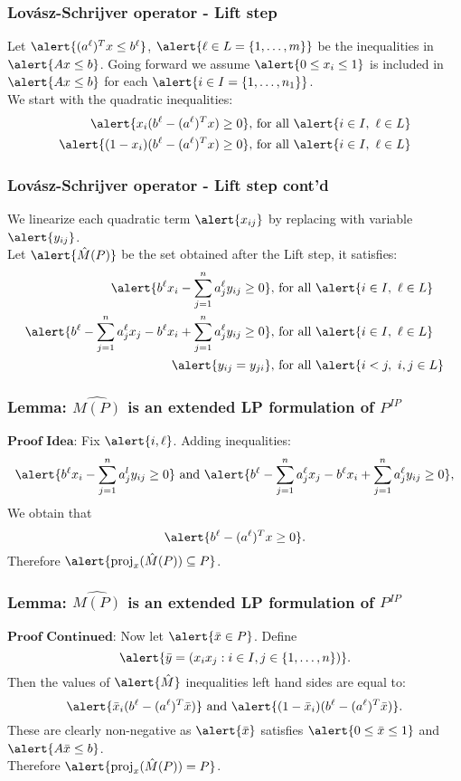 \documentclass{beamer}
\DeclareMathOperator{\proj}{proj}
\begin{document}
\begin{frame}
\frametitle{Lov\'asz-Schrijver operator - Lift step}
Let $\alert{(a^\ell)^Tx \leq b^\ell}$, $\alert{\ell \in L = \{1, \dots, m\}}$ be the inequalities in $\alert{Ax \leq b}$. Going forward we assume $\alert{0 \leq x_i \leq 1}$ is included in $\alert{Ax \leq b}$ for each $\alert{i \in I = \{1,\dots,n_1\}}$.
\\ We start with the quadratic inequalities:
\begin{align*}
\alert{x_i(b^\ell - (a^\ell)^Tx) \geq 0}, &\text{ for all } \alert{i\in I,\ \ell \in L} \\
\alert{(1-x_i)(b^\ell - (a^\ell)^Tx) \geq 0}, &\text{ for all }\alert{ i\in I,\ \ell \in L} \\
\end{align*}
\end{frame}
\begin{frame}
\frametitle{Lov\'asz-Schrijver operator - Lift step cont'd}
We linearize each  quadratic term $\alert{x_{ij}}$ by replacing with variable $\alert{y_{ij}}$.\\
Let $\alert{\hat{M}(P)}$ be the set obtained after the Lift step, it satisfies:
\begin{align*}
\alert{b^\ell x_i - \sum_{j=1}^n a_j^\ell y_{ij} \geq 0}, &\text{ for all } \alert{i \in I,\ \ell \in L} \\
\alert{b^\ell - \sum_{j = 1}^n a^\ell_j x_j - b^\ell x_i + \sum_{j = 1}^n a_j^\ell y_{ij} \geq 0}, &\text{ for all } \alert{i \in I,\ \ell \in L} \\
\alert{y_{ij} = y_{ji}}, &\text{ for all } \alert{i<j,\ i,j \in L}
\end{align*}
\end{frame}

\begin{frame}
\frametitle{Lemma: $\hat{M(P)}$ is an extended LP formulation of $P^{IP}$}
$\textbf{Proof Idea:}$ Fix $\alert{i, \ell}$. Adding inequalities:
$$\alert{b^\ell x_i - \sum_{j=1}^n a_j^l y_{ij} \geq 0} \text{ and } \alert{b^\ell -\sum_{j=1}^n a_j^\ell x_j - b^\ell x_i + \sum_{j=1}^n a_j^\ell y_{ij} \geq 0},$$
We obtain that $$\alert{b^\ell -(a^\ell)^Tx \geq 0}.$$
Therefore $\alert{\proj_x(\hat{M}(P)) \subseteq P}$.
\end{frame}

\begin{frame}
\frametitle{Lemma: $\hat{M(P)}$ is an extended LP formulation of $P^{IP}$}
$\textbf{Proof Continued:}$ Now let $\alert{\bar{x} \in P}$. Define $$\alert{\bar{y}=(x_i x_j : i \in I, j \in \{1, \dots, n\})}.$$
Then the values of $\alert{\hat{M}}$ inequalities left hand sides are equal to:
$$\alert{\bar{x}_i (b^\ell - (a^\ell)^T \bar{x})} \text{ and } \alert{(1-\bar{x}_i )(b^\ell - (a^\ell)^T \bar{x})}.$$
These are clearly non-negative as $\alert{\bar{x}}$ satisfies $\alert{0 \leq \bar{x} \leq 1}$ and $\alert{A \bar{x} \leq b}$.\\
Therefore $\alert{\proj_x(\hat{M}(P)) = P}$.
\end{frame}
\end{document}
